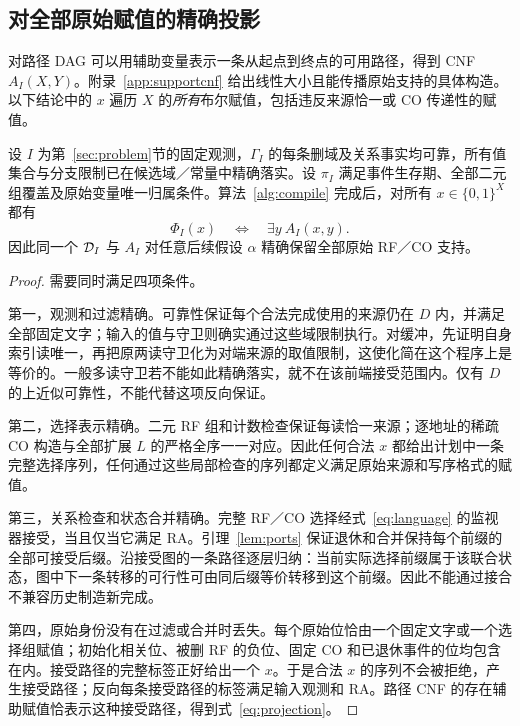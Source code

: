 \subsection{对全部原始赋值的精确投影}\label{sec:projection}
对路径 DAG 可以用辅助变量表示一条从起点到终点的可用路径，得到 CNF $A_I(X,Y)$。附录~\ref{app:supportcnf} 给出线性大小且能传播原始支持的具体构造。以下结论中的 $x$ 遍历 $X$ 的\emph{所有}布尔赋值，包括违反来源恰一或 CO 传递性的赋值。

\begin{theorem}[精确原始投影]\label{thm:projection}
设 $I$ 为第~\ref{sec:problem}节的固定观测，$\Gamma_I$ 的每条删域及关系事实均可靠，所有值集合与分支限制已在候选域／常量中精确落实。设 $\pi_I$ 满足事件生存期、全部二元组覆盖及原始变量唯一归属条件。算法~\ref{alg:compile} 完成后，对所有 $x\in\{0,1\}^X$ 都有
\begin{equation}\label{eq:projection}
 \Phi_I(x)\quad\Longleftrightarrow\quad\exists y\ A_I(x,y).
\end{equation}
因此同一个 $\mathcal{D}_I$ 与 $A_I$ 对任意后续假设 $\alpha$ 精确保留全部原始 RF／CO 支持。
\end{theorem}
\begin{proof}
需要同时满足四项条件。

第一，观测和过滤精确。可靠性保证每个合法完成使用的来源仍在 $D$ 内，并满足全部固定文字；输入的值与守卫则确实通过这些域限制执行。对缓冲，先证明自身索引读唯一，再把原两读守卫化为对端来源的取值限制，这使化简在这个程序上是等价的。一般多读守卫若不能如此精确落实，就不在该前端接受范围内。仅有 $D$ 的上近似可靠性，不能代替这项反向保证。

第二，选择表示精确。二元 RF 组和计数检查保证每读恰一来源；逐地址的稀疏 CO 构造与全部扩展 $L$ 的严格全序一一对应。因此任何合法 $x$ 都给出计划中一条完整选择序列，任何通过这些局部检查的序列都定义满足原始来源和写序格式的赋值。

第三，关系检查和状态合并精确。完整 RF／CO 选择经式~\eqref{eq:language} 的监视器接受，当且仅当它满足 RA。引理~\ref{lem:ports} 保证退休和合并保持每个前缀的全部可接受后缀。沿接受图的一条路径逐层归纳：当前实际选择前缀属于该联合状态，图中下一条转移的可行性可由同后缀等价转移到这个前缀。因此不能通过接合不兼容历史制造新完成。

第四，原始身份没有在过滤或合并时丢失。每个原始位恰由一个固定文字或一个选择组赋值；初始化相关位、被删 RF 的负位、固定 CO 和已退休事件的位均包含在内。接受路径的完整标签正好给出一个 $x$。于是合法 $x$ 的序列不会被拒绝，产生接受路径；反向每条接受路径的标签满足输入观测和 RA。路径 CNF 的存在辅助赋值恰表示这种接受路径，得到式~\eqref{eq:projection}。\qedhere
\end{proof}

